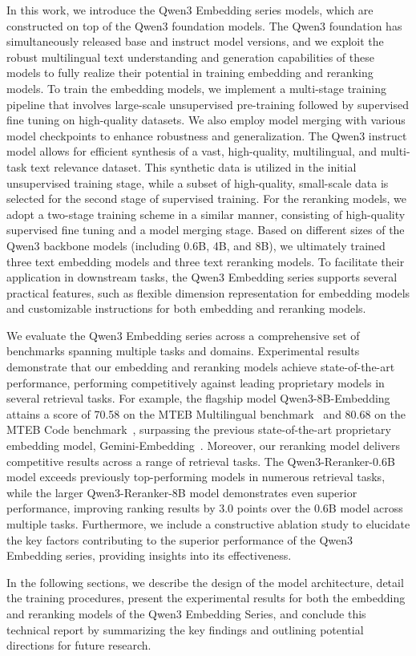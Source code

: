 In this work, we introduce the Qwen3 Embedding series models, which are constructed on top of the Qwen3 foundation models. The Qwen3 foundation has simultaneously released base and instruct model versions, and we exploit the robust multilingual text understanding and generation capabilities of these models to fully realize their potential in training embedding and reranking models. To train the embedding models, we implement a multi-stage training pipeline that involves large-scale unsupervised pre-training followed by supervised fine tuning on high-quality datasets. We also employ model merging with various model checkpoints to enhance robustness and generalization. The Qwen3 instruct model allows for efficient synthesis of a vast, high-quality, multilingual, and multi-task text relevance dataset. This synthetic data is utilized in the initial unsupervised training stage, while a subset of high-quality, small-scale data is selected for the second stage of supervised training. For the reranking models, we adopt a two-stage training scheme in a similar manner, consisting of high-quality supervised fine tuning and a model merging stage. Based on different sizes of the Qwen3 backbone models (including 0.6B, 4B, and 8B), we ultimately trained three text embedding models and three text reranking models. To facilitate their application in downstream tasks, the Qwen3 Embedding series supports several practical features, such as flexible dimension representation for embedding models and customizable instructions for both embedding and reranking models.

We evaluate the Qwen3 Embedding series across a comprehensive set of benchmarks spanning multiple tasks and domains. Experimental results demonstrate that our embedding and reranking models achieve state-of-the-art performance, performing competitively against leading proprietary models in several retrieval tasks. For example, the flagship model Qwen3-8B-Embedding attains a score of 70.58 on the MTEB Multilingual benchmark~\citep{enevoldsen2025mmteb} and 80.68 on the MTEB Code benchmark~\citep{enevoldsen2025mmteb}, surpassing the previous state-of-the-art proprietary embedding model, Gemini-Embedding~\citep{lee2025gemini}. Moreover, our reranking model delivers competitive results across a range of retrieval tasks. The Qwen3-Reranker-0.6B model exceeds previously top-performing models in numerous retrieval tasks, while the larger Qwen3-Reranker-8B model demonstrates even superior performance, improving ranking results by 3.0 points over the 0.6B model across multiple tasks. Furthermore, we include a constructive ablation study to elucidate the key factors contributing to the superior performance of the Qwen3 Embedding series, providing insights into its effectiveness.

In the following sections, we describe the design of the model architecture, detail the training procedures, present the experimental results for both the embedding and reranking models of the Qwen3 Embedding Series, and conclude this technical report by summarizing the key findings and outlining potential directions for future research.